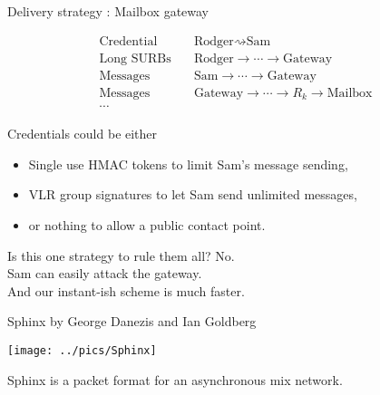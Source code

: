 \documentclass[fleqn,xcolor={usenames,dvipsnames}]{beamer}
\begin{document}
\begin{frame}[t]{Delivery strategy : Mailbox gateway}

\[ \begin{aligned}
\textrm{Credential}\quad & \textrm{Rodger} \rightsquigarrow \textrm{Sam} \\
\textrm{Long SURBs}\quad & \textrm{Rodger} \to \cdots \to \textrm{Gateway} \\
\textrm{Messages}\quad & \textrm{Sam} \to \cdots \to \textrm{Gateway} \\
\textrm{Messages}\quad & \textrm{Gateway} \to \cdots \to R_k \to \textrm{Mailbox} \\
 \cdots
\end{aligned} \]


Credentials could be either 
\begin{itemize}
\item Single use HMAC tokens to limit Sam's message sending, 
\item VLR group signatures to let Sam send unlimited messages,
\item or nothing to allow a public contact point.
\end{itemize}

\bigskip
Is this one strategy to rule them all?  No. \\
 \hspace*{2pt} Sam can easily attack the gateway. \\
 \hspace*{2pt} And our instant-ish scheme is much faster.

\end{frame}


\begin{frame}{Sphinx by George Danezis and Ian Goldberg}

\begin{center}
\texttt{[image: ../pics/Sphinx]}

Sphinx is a packet format for an asynchronous mix network. 

\end{center}
\end{frame}
\end{document}
